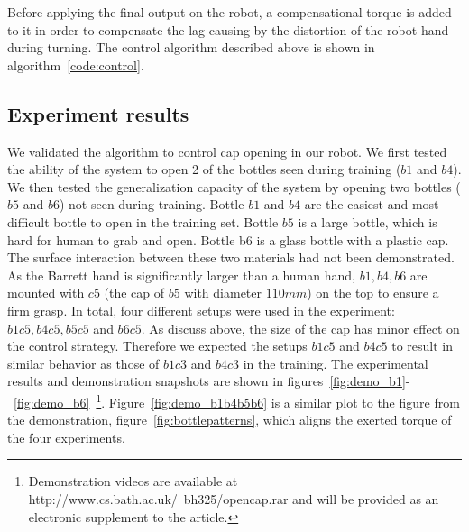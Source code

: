 
Before applying the final output on the robot, a compensational torque is
added to it in order to compensate the lag causing by the distortion
of the robot hand during turning. The control algorithm described
above is shown in algorithm~\ref{code:control}.


\subsection{Experiment results}



We validated the algorithm to control cap opening in our robot. We
first tested the ability of the system to open 2 of the bottles seen
during training ($b1$ and $b4$). We then tested the generalization
capacity of the system by opening two bottles ($b5$ and $b6$) not seen
during training.  Bottle $b1$ and $b4$ are the easiest and most difficult
bottle to open in the training set.  Bottle $b5$ is a large bottle,
which is hard for human to grab and open. Bottle b6 is a glass bottle
with a plastic cap. The surface interaction between these two
materials had not been demonstrated. As the Barrett hand is
significantly larger than a human hand, $b1, b4, b6$ are mounted with
$c5$ (the cap of $b5$ with diameter $110 mm$) on the top to ensure a
firm grasp. In total, four different setups were used in the
experiment: $b1c5, b4c5, b5c5$ and $b6c5$. As discuss above, the size
of the cap has minor effect on the control strategy. Therefore we
expected the setups $b1c5$ and $b4c5$ to result in similar behavior as
those of $b1c3$ and $b4c3$ in the training. The experimental results
and demonstration snapshots are shown in
figures~\ref{fig:demo_b1}-~\ref{fig:demo_b6}~\footnote{Demonstration
  videos are available at http://www.cs.bath.ac.uk/~bh325/opencap.rar
  and will be provided as an electronic supplement to the
  article.}. Figure~\ref{fig:demo_b1b4b5b6} is a similar plot to the
figure from the demonstration, figure~\ref{fig:bottlepatterns}, which
aligns the exerted torque of the four experiments. %

